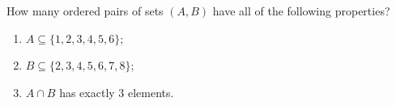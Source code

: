 How many ordered pairs of sets $(A,B)$ have all of the following properties?
\begin{enumerate}
\item $A\subseteq\{1,2,3,4,5,6\}$;
\item $B\subseteq\{2,3,4,5,6,7,8\}$;
\item $A\cap B$ has exactly $3$ elements.
\end{enumerate}
